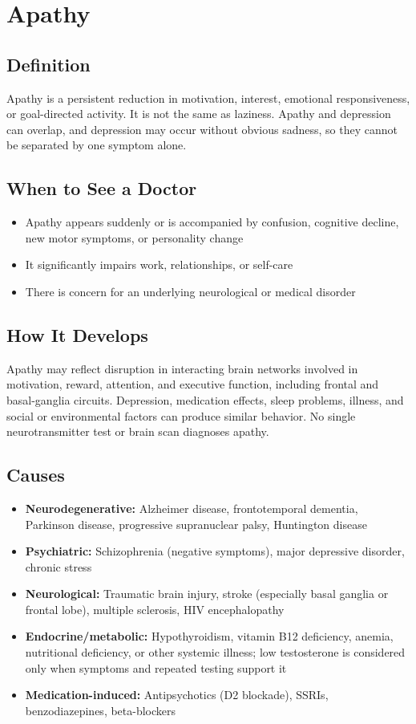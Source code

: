 \chapter{Apathy}

\section*{Definition}
Apathy is a persistent reduction in motivation, interest, emotional responsiveness, or goal-directed activity. It is not the same as laziness. Apathy and depression can overlap, and depression may occur without obvious sadness, so they cannot be separated by one symptom alone.

\section*{When to See a Doctor}

\begin{itemize}
 \item Apathy appears suddenly or is accompanied by confusion, cognitive decline, new motor symptoms, or personality change
 \item It significantly impairs work, relationships, or self-care
 \item There is concern for an underlying neurological or medical disorder
\end{itemize}

\section*{How It Develops}
Apathy may reflect disruption in interacting brain networks involved in motivation, reward, attention, and executive function, including frontal and basal-ganglia circuits. Depression, medication effects, sleep problems, illness, and social or environmental factors can produce similar behavior. No single neurotransmitter test or brain scan diagnoses apathy.

\section*{Causes}
\begin{itemize}
 \item \textbf{Neurodegenerative:} Alzheimer disease, frontotemporal dementia, Parkinson disease, progressive supranuclear palsy, Huntington disease
 \item \textbf{Psychiatric:} Schizophrenia (negative symptoms), major depressive disorder, chronic stress
 \item \textbf{Neurological:} Traumatic brain injury, stroke (especially basal ganglia or frontal lobe), multiple sclerosis, HIV encephalopathy
 \item \textbf{Endocrine/metabolic:} Hypothyroidism, vitamin B12 deficiency, anemia, nutritional deficiency, or other systemic illness; low testosterone is considered only when symptoms and repeated testing support it
 \item \textbf{Medication-induced:} Antipsychotics (D2 blockade), SSRIs, benzodiazepines, beta-blockers
\end{itemize}

